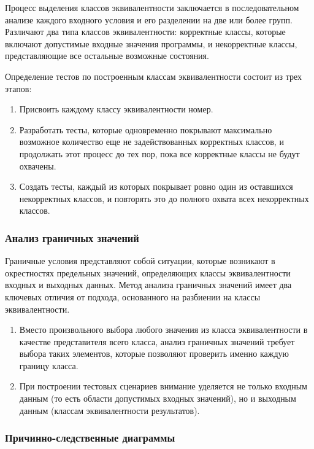 \documentclass{article}[14pt]
\begin{document}
Процесс выделения классов эквивалентности заключается в последовательном анализе каждого входного условия 
и его разделении на две или более групп. Различают 
два типа классов эквивалентности: корректные классы, которые включают допустимые входные значения программы, и 
некорректные классы, представляющие все остальные возможные состояния.

Определение тестов по построенным классам эквивалентности состоит из трех этапов:

\begin{enumerate}
    \item Присвоить каждому классу эквивалентности номер.
    \item Разработать тесты, которые одновременно покрывают максимально возможное количество еще не задействованных 
    корректных классов, и продолжать этот процесс до тех пор, пока все корректные классы не будут охвачены.
    \item Создать тесты, каждый из которых покрывает ровно один из оставшихся некорректных классов, и повторять это 
    до полного охвата всех некорректных классов.
\end{enumerate}

\subsubsection{Анализ граничных значений}

Граничные условия представляют собой ситуации, которые возникают в окрестностях предельных значений, определяющих 
классы эквивалентности входных и выходных данных. Метод анализа граничных значений имеет два ключевых отличия от подхода, 
основанного на разбиении на классы эквивалентности.

\begin{enumerate}
    \item Вместо произвольного выбора любого значения из класса эквивалентности в качестве представителя всего класса, 
    анализ граничных значений требует выбора таких элементов, которые позволяют проверить именно каждую границу класса.
    \item При построении тестовых сценариев внимание уделяется не только входным данным (то есть области допустимых 
    входных значений), но и выходным данным (классам эквивалентности результатов).
\end{enumerate}

\subsubsection{Причинно-следственные диаграммы}
\end{document}

